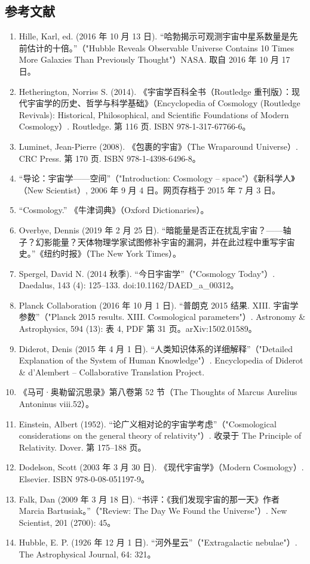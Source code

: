\subsection{参考文献}
\begin{enumerate}
\item Hille, Karl, ed. (2016 年 10 月 13 日). “哈勃揭示可观测宇宙中星系数量是先前估计的十倍。”（"Hubble Reveals Observable Universe Contains 10 Times More Galaxies Than Previously Thought"）NASA. 取自 2016 年 10 月 17 日。  
\item Hetherington, Norriss S. (2014). 《宇宙学百科全书（Routledge 重刊版）：现代宇宙学的历史、哲学与科学基础》（Encyclopedia of Cosmology (Routledge Revivals): Historical, Philosophical, and Scientific Foundations of Modern Cosmology）. Routledge. 第 116 页. ISBN 978-1-317-67766-6。  
\item Luminet, Jean-Pierre (2008). 《包裹的宇宙》（The Wraparound Universe）. CRC Press. 第 170 页. ISBN 978-1-4398-6496-8。  
\item “导论：宇宙学——空间”（"Introduction: Cosmology – space"）《新科学人》（New Scientist）, 2006 年 9 月 4 日。网页存档于 2015 年 7 月 3 日。  
\item “Cosmology.” 《牛津词典》（Oxford Dictionaries）。  
\item Overbye, Dennis (2019 年 2 月 25 日). “暗能量是否正在扰乱宇宙？——轴子？幻影能量？天体物理学家试图修补宇宙的漏洞，并在此过程中重写宇宙史。”《纽约时报》（The New York Times）。  
\item Spergel, David N. (2014 秋季). “今日宇宙学”（"Cosmology Today"）. Daedalus, 143 (4): 125–133. doi:10.1162/DAED_a_00312。  
\item Planck Collaboration (2016 年 10 月 1 日). “普朗克 2015 结果. XIII. 宇宙学参数”（"Planck 2015 results. XIII. Cosmological parameters"）. Astronomy & Astrophysics, 594 (13): 表 4, PDF 第 31 页。arXiv:1502.01589。  
\item Diderot, Denis (2015 年 4 月 1 日). “人类知识体系的详细解释”（"Detailed Explanation of the System of Human Knowledge"）. Encyclopedia of Diderot & d'Alembert – Collaborative Translation Project.  
\item 《马可·奥勒留沉思录》第八卷第 52 节（The Thoughts of Marcus Aurelius Antoninus viii.52）。  
\item Einstein, Albert (1952). “论广义相对论的宇宙学考虑”（"Cosmological considerations on the general theory of relativity"）. 收录于 The Principle of Relativity. Dover. 第 175–188 页。  
\item Dodelson, Scott (2003 年 3 月 30 日). 《现代宇宙学》（Modern Cosmology）. Elsevier. ISBN 978-0-08-051197-9。  
\item Falk, Dan (2009 年 3 月 18 日). “书评：《我们发现宇宙的那一天》作者 Marcia Bartusiak。”（"Review: The Day We Found the Universe"）. New Scientist, 201 (2700): 45。  
\item Hubble, E. P. (1926 年 12 月 1 日). “河外星云”（"Extragalactic nebulae"）. The Astrophysical Journal, 64: 321。  


\end{enumerate}
